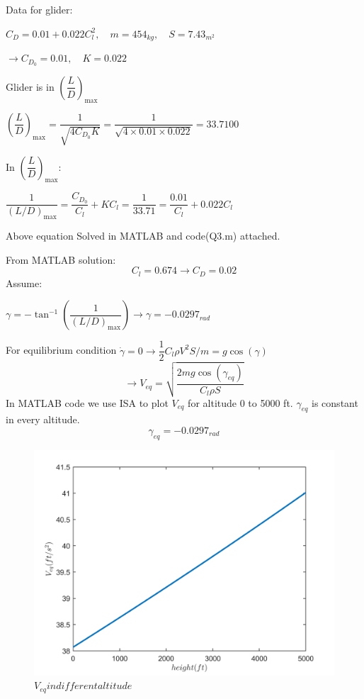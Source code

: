 Data for glider:


$C_D = 0.01 + 0.022C_l^2, \quad m = 454_{kg}, \quad S = 7.43_{m^2}$


$\to C_{D_0} = 0.01, \quad K = 0.022$


Glider is in $(\dfrac{L}{D})_{\max}$

$(\dfrac{L}{D})_{\max} = \dfrac{1}{\sqrt{4C_{D_0}K}} = \dfrac{1}{\sqrt{4\times 0.01 \times 0.022}} = 33.7100$


In $(\dfrac{L}{D})_{\max}$:


$\dfrac{1}{(L/D)_{\max}} = \dfrac{C_{D_0}}{C_l} + K C_l = \dfrac{1}{33.71} = \dfrac{0.01}{C_l} + 0.022 C_l $ 


Above equation Solved in MATLAB and code(Q3.m) attached.


From MATLAB solution:
$$C_l = 0.674\to C_D = 0.02$$ 
Assume:


$\gamma = -\tan^{-1}(\dfrac{1}{(L/D)_{\max}}) \to \gamma = -0.0297_{rad}$


For equilibrium condition $\dot{\gamma} = 0 
\to \dfrac12 C_l  \rho V^2S/m = g\cos(\gamma)$
$$\to V_{eq} = \sqrt{\dfrac{2mg\cos(\gamma_{eq})}{C_l \rho S}}$$
In MATLAB code we use ISA to plot $V_{eq}$ for altitude 0 to 5000 ft.
$\gamma_{eq}$ is constant in every altitude.
$$\gamma_{eq} = -0.0297_{rad}$$
\begin{figure}[H]
	\caption{$V_{eq} in different altitude$}
	\centering
	\includegraphics[width=12cm]{Q3/figures/V_eq.png}
\end{figure}

